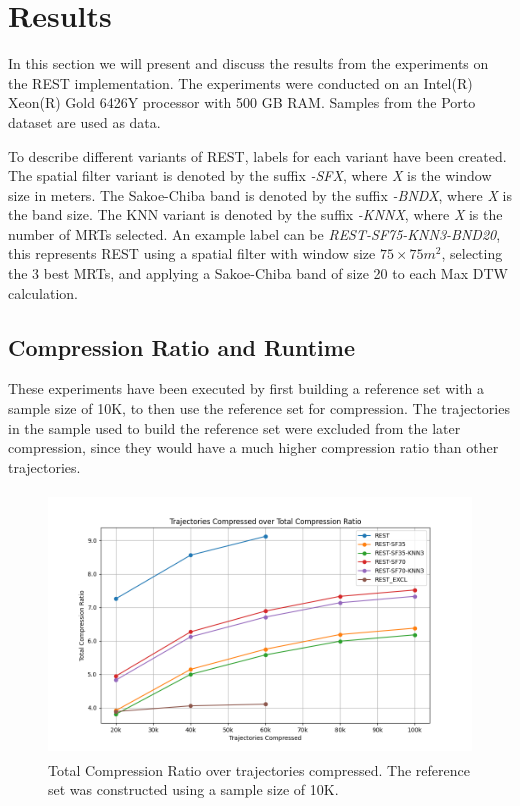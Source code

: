 \chapter{Results}
\label{chap:res}
In this section we will present and discuss the results from the experiments on the REST implementation. The experiments were conducted on an Intel(R) Xeon(R) Gold 6426Y processor with 500 GB RAM. Samples from the Porto dataset are used as data.

To describe different variants of REST, labels for each variant have been created. The spatial filter variant is denoted by the suffix \textit{-SFX}, where \textit{X} is the window size in meters. The Sakoe-Chiba band is denoted by the suffix \textit{-BNDX}, where \textit{X} is the band size. The KNN variant is denoted by the suffix \textit{-KNNX}, where \textit{X} is the number of MRTs selected. An example label can be \textit{REST-SF75-KNN3-BND20}, this represents REST using a spatial filter with window size $75\times75 m^2$, selecting the 3 best MRTs, and applying a Sakoe-Chiba band of size 20 to each Max DTW calculation.

\section{Compression Ratio and Runtime}
These experiments have been executed by first building a reference set with a sample size of 10K, to then use the reference set for compression. The trajectories in the sample used to build the reference set were excluded from the later compression, since they would have a much higher compression ratio than other trajectories.

\begin{figure}[t]
    \begin{minipage}{0.99\linewidth}
        \centering
        \includegraphics[height=7cm, keepaspectratio]{./figures/tot_compression.png}
        \caption{Total Compression Ratio over trajectories compressed. The reference set was constructed using a sample size of 10K.}
        \label{fig:n_compression}
    \end{minipage}
\end{figure}

